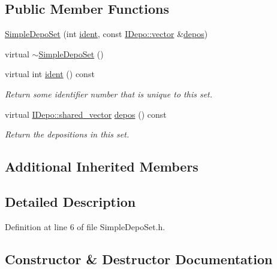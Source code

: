 \subsection*{Public Member Functions}
\begin{DoxyCompactItemize}
\item 
\hyperlink{class_wire_cell_1_1_simple_depo_set_aa842c6310fa4b73bc30cf62913a6737b}{Simple\+Depo\+Set} (int \hyperlink{class_wire_cell_1_1_simple_depo_set_a1b5301daed3b2e8981994e7218be1d35}{ident}, const \hyperlink{class_wire_cell_1_1_i_data_ae1a9f863380499bb43f39fabb6276660}{I\+Depo\+::vector} \&\hyperlink{class_wire_cell_1_1_simple_depo_set_ad52d0c0bbec9c993efbba14c1aaed564}{depos})
\item 
virtual \hyperlink{class_wire_cell_1_1_simple_depo_set_ac005a5edae9e6e2da09983f4c798db78}{$\sim$\+Simple\+Depo\+Set} ()
\item 
virtual int \hyperlink{class_wire_cell_1_1_simple_depo_set_a1b5301daed3b2e8981994e7218be1d35}{ident} () const
\begin{DoxyCompactList}\small\item\em Return some identifier number that is unique to this set. \end{DoxyCompactList}\item 
virtual \hyperlink{class_wire_cell_1_1_i_data_a6edac35e7dd886018740993b28c7ca1e}{I\+Depo\+::shared\+\_\+vector} \hyperlink{class_wire_cell_1_1_simple_depo_set_ad52d0c0bbec9c993efbba14c1aaed564}{depos} () const
\begin{DoxyCompactList}\small\item\em Return the depositions in this set. \end{DoxyCompactList}\end{DoxyCompactItemize}
\subsection*{Additional Inherited Members}


\subsection{Detailed Description}


Definition at line 6 of file Simple\+Depo\+Set.\+h.



\subsection{Constructor \& Destructor Documentation}
\mbox{\label{class_wire_cell_1_1_simple_depo_set_aa842c6310fa4b73bc30cf62913a6737b}} 
